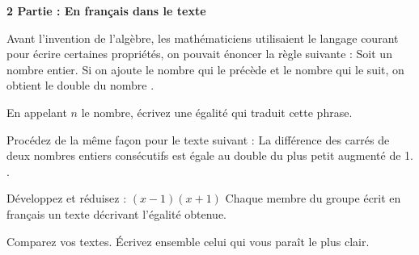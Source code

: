 \begin{TP}
 
\vspace{1em}\textbf{2 Partie : En français dans le texte}\vspace{1em}


Avant l'invention de l'algèbre, les mathématiciens utilisaient le langage courant pour écrire certaines propriétés, on pouvait énoncer la règle suivante :
\og Soit un nombre entier. Si on ajoute le nombre qui le précède et le nombre qui le suit, on obtient le double du nombre \fg.
\item En appelant $n$ le nombre, écrivez une égalité qui traduit cette phrase.
\item Procédez de la même façon pour le texte suivant : \og La différence des carrés de deux nombres entiers consécutifs est égale au double du plus petit augmenté de 1. \fg.
\item Développez et réduisez : $(x - 1)(x + 1)$ Chaque membre du groupe écrit en français un texte décrivant l'égalité obtenue.
\item Comparez vos textes. Écrivez ensemble celui qui vous paraît le plus clair.

\end{TP}




\newpage

